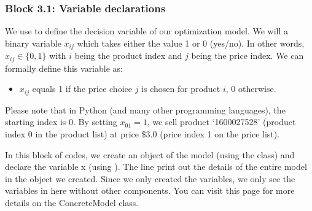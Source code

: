 \documentclass[letterpaper,10pt,english]{jupyterBook}
\begin{document}
\subsubsection{Block 3.1: Variable declarations}
\label{\detokenize{docs/Case1_4_Module2A_Retail_Price_Optimization:block-3-1-variable-declarations}}
\sphinxAtStartPar
We use  to define the decision variable of our optimization model. We will a binary variable \(x_{ij}\) which takes either the value 1 or 0 (yes/no). In other words, \(x_{ij} \in \{0,1\}\) with \(i\) being the product index and \(j\) being the price index. We can formally define this variable as:
\begin{itemize}
\item {} 
\sphinxAtStartPar
\(x_{ij}\) equals 1 if the price choice \(j\) is chosen for product \(i\), 0 otherwise.

\end{itemize}

\sphinxAtStartPar
Please note that in Python (and many other programming languages), the starting index is 0. By setting \(x_{01}=1\), we sell product ‘1600027528’ (product index 0 in the product list) at price \$3.0 (price index 1 on the price list).

\sphinxAtStartPar
In this block of codes, we create an object of the model (using the  class) and declare the variable x (using ). The line  print out the details of the entire model in the object we created. Since we only created the variables, we only see the variables in here without other components. You can visit this page  for more details on the ConcreteModel class.
\end{document}
